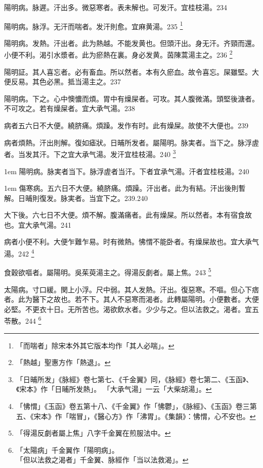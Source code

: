 陽明病。脉遲。汗出多。微惡寒者。表未解也。可发汗。宜桂枝湯。234

陽明病。脉浮。无汗而喘者。发汗則愈。宜麻黄湯。235
	\footnote{「而喘者」除宋本外其它版本均作「其人必喘」。}

陽明病。发熱。汗出者。此为熱越。不能发黄也。但頭汗出。身无汗。齐頸而還。小便不利。渴引水漿者。此为瘀熱在裏。身必发黄。茵陳{\khaaitp 蒿}湯主之。236
	\footnote{「熱越」聖惠方作「熱退」。}

陽明証。其人喜忘者。必有畜血。所以然者。本有久瘀血。故令喜忘。屎雖堅。大便反易。其色必黑。抵当湯主之。237

陽明病。下之。心中懊憹而煩。胃中有燥屎者。可攻。其人腹微滿。頭堅後溏者。不可攻之。若有燥屎者。宜{\khaaitp 大}承气湯。238

病者五六日不大便。繞脐痛。煩躁。发作有时。此有燥屎。故使不大便也。239

病者煩熱。汗出則解。復如瘧狀。日晡所发者。屬陽明。脉実者。当下之。脉浮虗者。当发其汗。下之宜{\khaaitp 大}承气湯。发汗宜桂枝湯。240
	\footnote{
		「日晡所发」《脉經》卷七第七、《千金翼》同，《脉經》卷七第二、《玉函》、《宋本》作「日晡所发熱」。
		「大承气湯」一云「大柴胡湯」。
	}

\hangindent 1em
陽明病。脉実者当下。脉浮虗者当汗。下者宜承气湯。汗者宜桂枝湯。{\gaoben}240

\hangindent 1em
傷寒病。五六日不大便。繞脐痛。煩躁。汗出者。此为有結。汗出後則暫解。日晡則復发。脉実者。当宜下之。{\gaoben}239.240

大下後。六七日不大便。煩不解。腹滿痛者。此有燥屎。所以然者。本有宿食故也。宜{\khaaitp 大}承气湯。241

病者小便不利。大便乍難乍易。时有微熱。怫㥜不能卧者。有燥屎故也。宜{\khaaitp 大}承气湯。242
	\footnote{
		「怫㥜」《玉函》卷五第十八、《千金翼》作「怫鬱」，《脉經》、《玉函》卷三第五、《宋本》作「喘冒」，《醫心方》作「沸胃」。《集韻》：怫㥜，心不安也。
	}

食穀欲嘔者。屬陽明。{\khaaitp 吳}茱萸湯主之。得湯反劇者。屬上焦。243
	\footnote{
		「得湯反劇者屬上焦」八字千金翼在煎服法中。
	}

太陽病。寸{\khaaitp 口}緩。関{\khaaitp 上小}浮。尺{\khaaitp 中}弱。其人发熱。汗出。復惡寒。不嘔。但心下痞者。此为醫下之故也。若不下。其人不惡寒而渴者。此轉屬陽明。小便數者。大便必堅。不更衣十日。无所苦也。{\khaaitp 渴}欲飲水者。少少与之。但以法救之。渴者。宜五苓散。244
	\footnote{
		「太陽病」千金翼作「陽明病」。\\
		「但以法救之渴者」千金翼、脉經作「当以法救渴」。
	}

